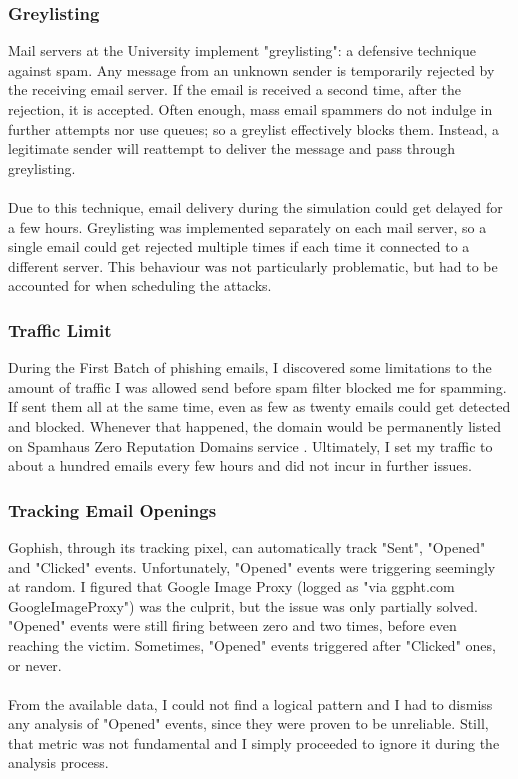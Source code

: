 \documentclass[a4paper]{article}
\begin{document}
\subsubsection{Greylisting}

Mail servers at the University implement "greylisting": a defensive technique against spam. Any message from an unknown sender is temporarily rejected by the receiving email server. If the email is received a second time, after the rejection, it is accepted. Often enough, mass email spammers do not indulge in further attempts nor use queues; so a greylist effectively blocks them. Instead, a legitimate sender will reattempt to deliver the message and pass through greylisting.
\\ \\
Due to this technique, email delivery during the simulation could get delayed for a few hours. Greylisting was implemented separately on each mail server, so a single email could get rejected multiple times if each time it connected to a different server. This behaviour was not particularly problematic, but had to be accounted for when scheduling the attacks.

\subsubsection{Traffic Limit}

During the First Batch of phishing emails, I discovered some limitations to the amount of traffic I was allowed send before spam filter blocked me for spamming. If sent them all at the same time, even as few as twenty emails could get detected and blocked. Whenever that happened, the domain would be permanently listed on Spamhaus Zero Reputation Domains service \cite{website-spamhaus}. Ultimately, I set my traffic to about a hundred emails every few hours and did not incur in further issues.

\subsubsection{Tracking Email Openings}

Gophish, through its tracking pixel, can automatically track "Sent", "Opened" and "Clicked" events. Unfortunately, "Opened" events were triggering seemingly at random. I figured that Google Image Proxy (logged as "via ggpht.com GoogleImageProxy") was the culprit, but the issue was only partially solved. "Opened" events were still firing between zero and two times, before even reaching the victim. Sometimes, "Opened" events triggered after "Clicked" ones, or never.
\\ \\
From the available data, I could not find a logical pattern and I had to dismiss any analysis of "Opened" events, since they were proven to be unreliable. Still, that metric was not fundamental and I simply proceeded to ignore it during the analysis process.
\end{document}
